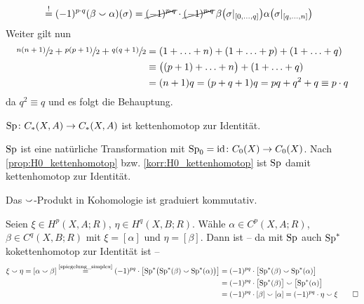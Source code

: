 \begin{beweis}
\begin{enumerate}[a)]
\begin{align}
			&\stackrel{!}{=} (-1)^{p \cdot q} \enbrace*{\beta \cupp \alpha}(\sigma) = \cancel{(-1)^{p \cdot q}} \cdot \cancel{(-1)^{p \cdot q}} \,\beta \enbrace*{\sigma|_{\benbrace{0, \ldots ,q}}} 
			\alpha \enbrace*{\sigma|_{\benbrace*{q, \ldots ,n}}}
		\end{align}
		Weiter gilt nun
		\begin{align}
			\sfrac{n(n+1)}{2} + \sfrac{p(p+1)}{2} + \sfrac{q(q+1)}{2} &= (1+ \ldots + n) + (1+ \ldots + p) + (1+ \ldots + q)\\ 
			&\equiv \enbrace[\big]{(p+1) + \ldots + n} + (1+ \ldots + q)\\
			&= (n+1) q = (p+q+1) q = pq + q^2 + q \equiv p \cdot q
		\end{align}
		da $q^2 \equiv q$ und es folgt die Behauptung. \qedhere
	\end{enumerate}
\end{beweis}

\begin{lemma}[{name=[Spiegelung ist kettenhomotop zur Identität]}]
	$\Sp \colon C_*(X,A) \to C_*(X,A)$ ist kettenhomotop zur Identität. 
\end{lemma}
\begin{beweis}
	$\Sp$ ist eine natürliche Transformation mit $\Sp_0 =\id \colon C_0(X) \to C_0(X)$.
	Nach \autoref{prop:H0_kettenhomotop} bzw. \autoref{korr:H0_kettenhomotop} ist $\Sp$ damit kettenhomotop zur Identität.
\end{beweis}

\begin{satz}[{name=[Das $\cupp$-Produkt in Kohomologie ist graduiert kommutativ]}]
	Das $\cupp$-Produkt in Kohomologie ist graduiert kommutativ. 
\end{satz}
\begin{beweis}
	Seien $\xi \in H^p(X,A;R)$, $\eta \in H^q(X,B;R)$. Wähle $\alpha \in C^p(X,A;R)$, $\beta \in C^q(X,B;R)$ mit $\xi= [\alpha]$ und $\eta= [\beta]$. Dann ist -- da mit $\Sp$ auch $\Sp^*$ kokettenhomotop zur Identität ist --
	\begin{align}
		\xi \cupp \eta = \benbrace*{\alpha \cupp \beta} \StackText{\ref{spiegelung_simplex}}{=} (-1)^{pq} \cdot \benbrace*{\Sp^* \enbrace[\big]{\Sp^*(\beta) \cupp \Sp^*(\alpha)}} &= (-1)^{pq} \cdot 
		\benbrace[\big]{\Sp^*(\beta) \cupp \Sp^*(\alpha)} \\
		&= (-1)^{pq} \cdot \benbrace[\big]{\Sp^*(\beta)} \cupp \benbrace[\big]{\Sp^*(\alpha)}\\ 
		&= (-1)^{pq} \cdot [\beta] \cupp [\alpha] = (-1)^{pq} \cdot \eta \cupp \xi \qedhere
	\end{align}
\end{beweis}

